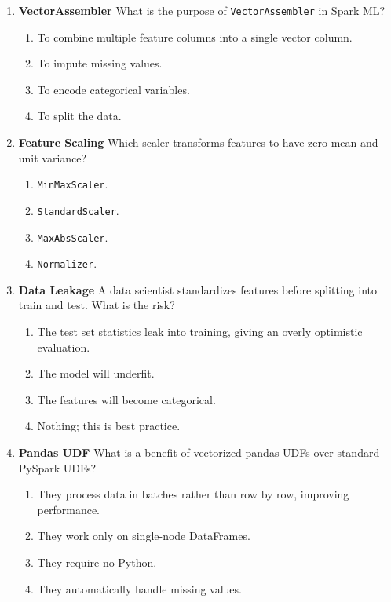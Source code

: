 \documentclass{article}
\begin{document}
\begin{enumerate}[label=\textbf{Q\arabic*.}]
		\item \textbf{VectorAssembler}
		What is the purpose of \texttt{VectorAssembler} in Spark ML?
		\begin{enumerate}[label=\Alph*.]
			\item To combine multiple feature columns into a single vector column.
			\item To impute missing values.
			\item To encode categorical variables.
			\item To split the data.
		\end{enumerate}
		
		\item \textbf{Feature Scaling}
		Which scaler transforms features to have zero mean and unit variance?
		\begin{enumerate}[label=\Alph*.]
			\item \texttt{MinMaxScaler}.
			\item \texttt{StandardScaler}.
			\item \texttt{MaxAbsScaler}.
			\item \texttt{Normalizer}.
		\end{enumerate}
		
		\item \textbf{Data Leakage}
		A data scientist standardizes features before splitting into train and test. What is the risk?
		\begin{enumerate}[label=\Alph*.]
			\item The test set statistics leak into training, giving an overly optimistic evaluation.
			\item The model will underfit.
			\item The features will become categorical.
			\item Nothing; this is best practice.
		\end{enumerate}
		
		\item \textbf{Pandas UDF}
		What is a benefit of vectorized pandas UDFs over standard PySpark UDFs?
		\begin{enumerate}[label=\Alph*.]
			\item They process data in batches rather than row by row, improving performance.
			\item They work only on single-node DataFrames.
			\item They require no Python.
			\item They automatically handle missing values.
		\end{enumerate}
		

\end{enumerate}
\end{document}
